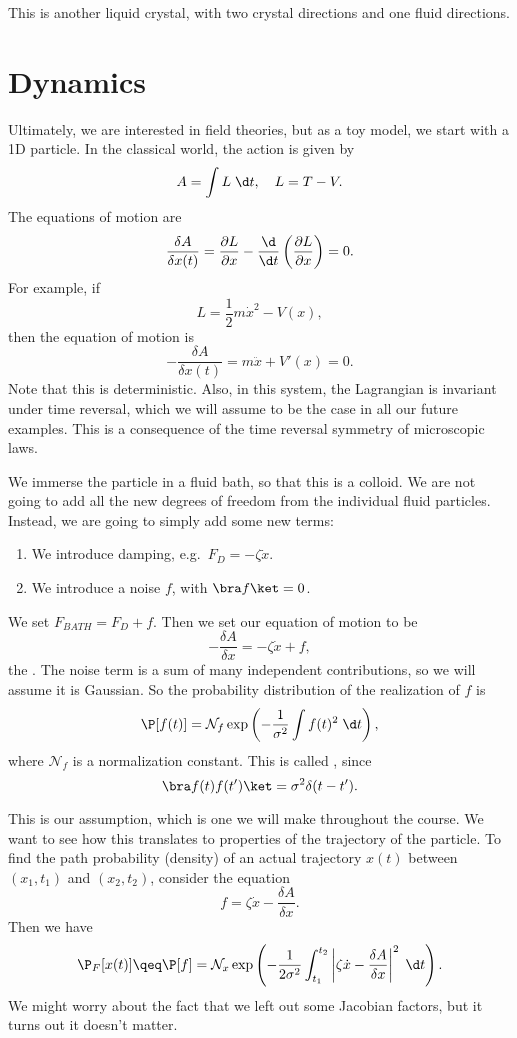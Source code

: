 \documentclass[a4paper]{article}
\begin{document}
This is another liquid crystal, with two crystal directions and one fluid directions.

\section{Dynamics}
Ultimately, we are interested in field theories, but as a toy model, we start with a 1D particle. In the classical world, the action is given by
\[
  A = \int L\;\d t,\quad L = T - V.
\]
The equations of motion are
\[
  \frac{\delta A}{\delta x(t)} = \frac{\partial L}{\partial x} - \frac{\d}{\d t} \left(\frac{\partial L}{\partial x}\right) = 0.
\]
For example, if
\[
  L = \frac{1}{2} m\dot{x}^2 - V(x),
\]
then the equation of motion is
\[
  -\frac{\delta A}{\delta x(t)} = m\ddot{x} + V'(x) = 0.
\]
Note that this is deterministic. Also, in this system, the Lagrangian is invariant under time reversal, which we will assume to be the case in all our future examples. This is a consequence of the time reversal symmetry of microscopic laws.

We immerse the particle in a fluid bath, so that this is a colloid. We are not going to add all the new degrees of freedom from the individual fluid particles. Instead, we are going to simply add some new terms:
\begin{enumerate}
  \item We introduce damping, e.g.\ $F_D = - \zeta \dot{x}$.
  \item We introduce a noise $f$, with $\bra f \ket = 0$.
\end{enumerate}
We set $F_{BATH} = F_D + f$. Then we set our equation of motion to be
\[
  -\frac{\delta A}{\delta x} = - \zeta \dot{x} + f,
\]
the . The noise term is a sum of many independent contributions, so we will assume it is Gaussian. So the probability distribution of the realization of $f$ is
\[
  \P[f(t)] = \mathcal{N}_f \exp \left(- \frac{1}{\sigma^2} \int f(t)^2 \;\d t\right),
\]
where $\mathcal{N}_f$ is a normalization constant. This is called , since
\[
  \bra f(t) f(t')\ket = \sigma^2 \delta(t - t').
\]

This is our assumption, which is one we will make throughout the course. We want to see how this translates to properties of the trajectory of the particle. To find the path probability (density) of an actual trajectory $x(t)$ between $(x_1, t_1)$ and $(x_2, t_2)$, consider the equation
\[
  f = \zeta \dot{x} - \frac{\delta A}{\delta x}.
\]
Then we have
\[
  \P_F[x(t)] \qeq \P[f] = \mathcal{N}_x \exp \left( -\frac{1}{2 \sigma^2} \int_{t_1}^{t_2} \left|\zeta \dot{x} - \frac{\delta A}{\delta x}\right|^2\;\d t\right).
\]
We might worry about the fact that we left out some Jacobian factors, but it turns out it doesn't matter.
\end{document}
